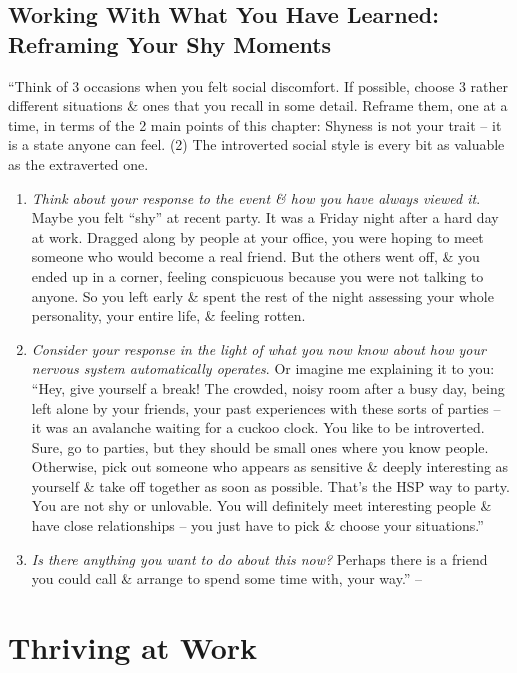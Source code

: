 \documentclass{article}
\numberwithin{equation}{section}
\begin{document}
\subsection{Working With What You Have Learned: Reframing Your Shy Moments}
``Think of 3 occasions when you felt social discomfort. If possible, choose 3 rather different situations \& ones that you recall in some detail. Reframe them, one at a time, in terms of the 2 main points of this chapter: Shyness is not your trait -- it is a state anyone can feel. (2) The introverted social style is every bit as valuable as the extraverted one.
\begin{enumerate}
	\item \textit{Think about your response to the event \& how you have always viewed it}. Maybe you felt ``shy'' at recent party. It was a Friday night after a hard day at work. Dragged along by people at your office, you were hoping to meet someone who would become a real friend. But the others went off, \& you ended up in a corner, feeling conspicuous because you were not talking to anyone. So you left early \& spent the rest of the night assessing your whole personality, your entire life, \& feeling rotten.
	\item \textit{Consider your response in the light of what you now know about how your nervous system automatically operates}. Or imagine me explaining it to you: ``Hey, give yourself a break! The crowded, noisy room after a busy day, being left alone by your friends, your past experiences with these sorts of parties -- it was an avalanche waiting for a cuckoo clock. You like to be introverted. Sure, go to parties, but they should be small ones where you know people. Otherwise, pick out someone who appears as sensitive \& deeply interesting as yourself \& take off together as soon as possible. That's the HSP way to party. You are not shy or unlovable. You will definitely meet interesting people \& have close relationships -- you just have to pick \& choose your situations.''
	\item \textit{Is there anything you want to do about this now?} Perhaps there is a friend you could call \& arrange to spend some time with, your way.'' -- \cite[p. 144]{Aron2013}
\end{enumerate}


\section{Thriving at Work}
\end{document}
